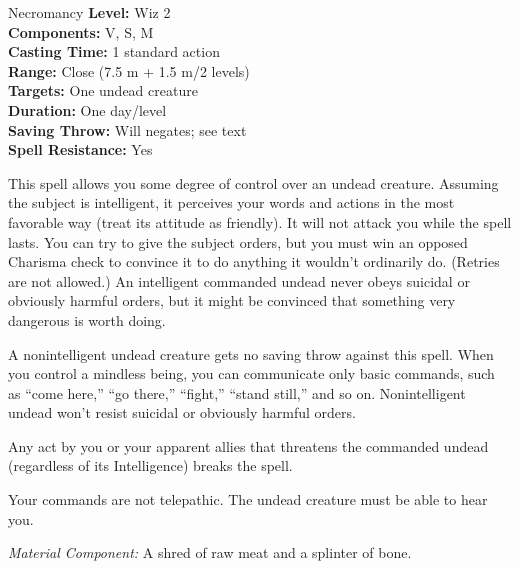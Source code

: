 {Necromancy}
{
	\textbf{Level:}
	Wiz 2\\
	\textbf{Components:}
	V, S, M\\
	\textbf{Casting Time:}
	1 standard action\\
	\textbf{Range:}
	Close (7.5 m + 1.5 m/2 levels)\\
	\textbf{Targets:}
	One undead creature\\
	\textbf{Duration:}
	One day/level\\
	\textbf{Saving Throw:}
	Will negates; see text\\
	\textbf{Spell Resistance:}
	Yes\\
}
{
	This spell allows you some degree of control over an undead creature. Assuming the subject is intelligent, it perceives your words and actions in the most favorable way (treat its attitude as friendly). It will not attack you while the spell lasts. You can try to give the subject orders, but you must win an opposed Charisma check to convince it to do anything it wouldn't ordinarily do. (Retries are not allowed.) An intelligent commanded undead never obeys suicidal or obviously harmful orders, but it might be convinced that something very dangerous is worth doing.

	A nonintelligent undead creature gets no saving throw against this spell. When you control a mindless being, you can communicate only basic commands, such as ``come here,'' ``go there,'' ``fight,'' ``stand still,'' and so on. Nonintelligent undead won't resist suicidal or obviously harmful orders.

	Any act by you or your apparent allies that threatens the commanded undead (regardless of its Intelligence) breaks the spell.

	Your commands are not telepathic. The undead creature must be able to hear you.

	\textit{Material Component:}
	A shred of raw meat and a splinter of bone.

}

